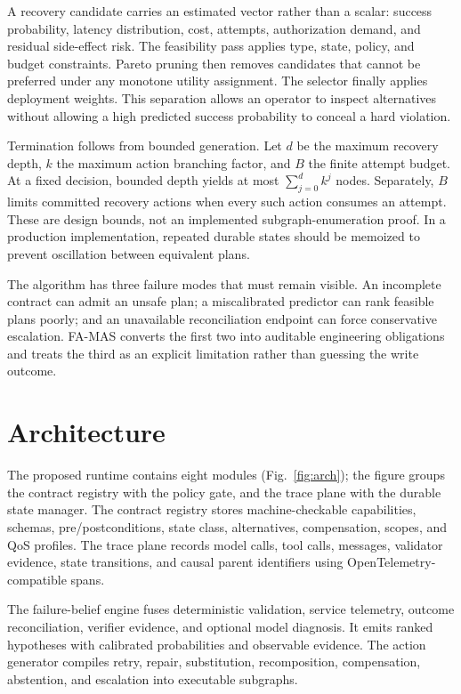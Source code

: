 \documentclass[10pt,journal,compsoc]{IEEEtran}
\newcommand{\famas}{FA-MAS}
\begin{document}
A recovery candidate carries an estimated vector rather than a scalar: success probability, latency distribution, cost, attempts, authorization demand, and residual side-effect risk. The feasibility pass applies type, state, policy, and budget constraints. Pareto pruning then removes candidates that cannot be preferred under any monotone utility assignment. The selector finally applies deployment weights. This separation allows an operator to inspect alternatives without allowing a high predicted success probability to conceal a hard violation.

Termination follows from bounded generation. Let $d$ be the maximum recovery depth, $k$ the maximum action branching factor, and $B$ the finite attempt budget. At a fixed decision, bounded depth yields at most $\sum_{j=0}^{d}k^j$ nodes. Separately, $B$ limits committed recovery actions when every such action consumes an attempt. These are design bounds, not an implemented subgraph-enumeration proof. In a production implementation, repeated durable states should be memoized to prevent oscillation between equivalent plans.

The algorithm has three failure modes that must remain visible. An incomplete contract can admit an unsafe plan; a miscalibrated predictor can rank feasible plans poorly; and an unavailable reconciliation endpoint can force conservative escalation. \famas{} converts the first two into auditable engineering obligations and treats the third as an explicit limitation rather than guessing the write outcome.

\section{Architecture}\label{sec:arch}
The proposed runtime contains eight modules (Fig.~\ref{fig:arch}); the figure groups the contract registry with the policy gate, and the trace plane with the durable state manager. The contract registry stores machine-checkable capabilities, schemas, pre/postconditions, state class, alternatives, compensation, scopes, and QoS profiles. The trace plane records model calls, tool calls, messages, validator evidence, state transitions, and causal parent identifiers using OpenTelemetry-compatible spans.

The failure-belief engine fuses deterministic validation, service telemetry, outcome reconciliation, verifier evidence, and optional model diagnosis. It emits ranked hypotheses with calibrated probabilities and observable evidence. The action generator compiles retry, repair, substitution, recomposition, compensation, abstention, and escalation into executable subgraphs.
\end{document}
